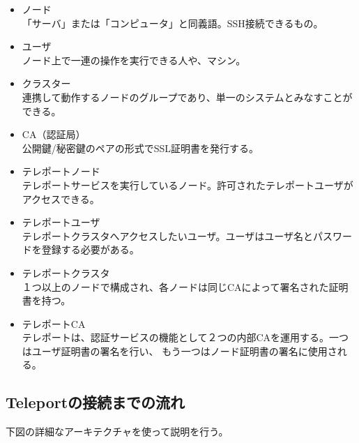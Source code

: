 \documentclass[12pt,a4paper,titlepage]{jreport}
\begin{document}
        
\begin{itemize}
    \item ノード\mbox{}\\「サーバ」または「コンピュータ」と同義語。SSH接続できるもの。
    \item ユーザ\mbox{}\\ノード上で一連の操作を実行できる人や、マシン。
    \item クラスター\mbox{}\\連携して動作するノードのグループであり、単一のシステムとみなすことができる。
    \item CA（認証局）\mbox{}\\公開鍵/秘密鍵のペアの形式でSSL証明書を発行する。
    \item テレポートノード\mbox{}\\テレポートサービスを実行しているノード。許可されたテレポートユーザがアクセスできる。
    \item テレポートユーザ\mbox{}\\テレポートクラスタへアクセスしたいユーザ。ユーザはユーザ名とパスワードを登録する必要がある。
    \item テレポートクラスタ\mbox{}\\１つ以上のノードで構成され、各ノードは同じCAによって署名された証明書を持つ。
    
    \item テレポートCA\mbox{}\\テレポートは、認証サービスの機能として２つの内部CAを運用する。一つはユーザ証明書の署名を行い、
    もう一つはノード証明書の署名に使用される。

    
\end{itemize}

\subsection*{Teleportの接続までの流れ}
下図の詳細なアーキテクチャを使って説明を行う。
\end{document}
